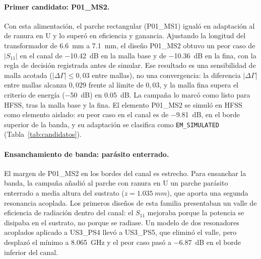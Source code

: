 \documentclass[11pt,a4paper]{article}
\begin{document}
\paragraph{Primer candidato: P01\_MS2.} Con esta alimentación, el parche rectangular (P01\_MS1) igualó en
adaptación al de ranura en U y lo superó en eficiencia y ganancia. Ajustando la longitud del transformador
de \SI{6.6}{mm} a \SI{7.1}{mm}, el diseño P01\_MS2 obtuvo un peor caso de $|S_{11}|$ en el canal de
\SI{-10.42}{dB} en la malla base y de \SI{-10.36}{dB} en la fina, con la regla de decisión registrada antes
de simular. Ese resultado es una sensibilidad de malla acotada ($|\Delta\Gamma| \le 0{,}03$ entre mallas), no una
convergencia: la diferencia $|\Delta\Gamma|$ entre mallas alcanza $0{,}029$ frente al límite de $0{,}03$, y
la malla fina supera el criterio de energía (\SI{-50}{dB}) en \SI{0.05}{dB}. La campaña lo marcó como listo para HFSS, tras la malla base y la fina. El elemento
P01\_MS2 se simuló en HFSS como elemento aislado: su peor caso en el canal es de \SI{-9.81}{dB}, en el borde superior de la banda, y su adaptación se clasifica como \texttt{EM\_SIMULATED} (Tabla~\ref{tab:candidatos}).

\paragraph{Ensanchamiento de banda: parásito enterrado.} El margen de P01\_MS2 en los bordes del canal es
estrecho. Para ensanchar la banda, la campaña añadió al parche con ranura en U un parche parásito enterrado a
media altura del sustrato ($z = \SI{1.035}{mm}$), que aporta una segunda resonancia acoplada. Los primeros
diseños de esta familia presentaban un valle de eficiencia de radiación dentro del canal: el $S_{11}$ mejoraba
porque la potencia se disipaba en el sustrato, no porque se radiase. Un modelo de dos resonadores
acoplados aplicado a US3\_PS4 llevó a US3\_PS5, que eliminó el valle, pero desplazó el mínimo a \SI{8.065}{GHz} y el peor caso pasó a
\SI{-6.87}{dB} en el borde inferior del canal.
\end{document}
